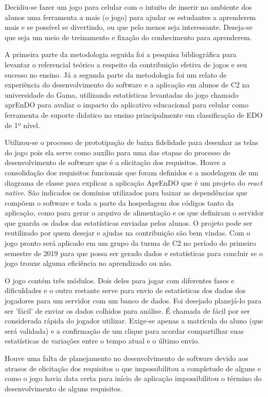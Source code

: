 Decidiu-se fazer um jogo para celular com o intuito de inserir no ambiente dos alunos uma ferramenta a mais (o jogo) para ajudar os estudantes a aprenderem mais e se possível se divertindo, ou que pelo menos seja interessante. Deseja-se que seja um meio de treinamento e fixação do conhecimento para aprenderem.

A primeira parte da metodologia seguida foi a pesquisa bibliográfica para levantar o referencial teórico a respeito da contribuição efetiva de jogos e seu sucesso no ensino. Já a segunda parte da metodologia foi um relato de experiência do desenvolvimento do software e a aplicação em alunos de C2 na universidade do Gama, utilizando estatísticas levantadas do jogo chamado aprEnDO para avaliar o impacto do aplicativo educacional para celular como ferramenta de suporte didatico no ensino principalmente em classificação de EDO de 1º nível.

Utilizou-se o processo de prototipação de baixa fidelidade para desenhar as telas do jogo pois ela serve como auxílio para uma das etapas do processo de desenvolvimento de software que é a elicitação dos requisitos. Houve a consolidação dos requisitos funcionais que foram definidos e a modelagem de um diagrama de classe para explicar a aplicação AprEnDO que é um projeto do \textit{react native}. São indicados os domínios utilizados para baixar as dependências que compõem o software e toda a parte da hospedagem dos códigos tanto da aplicação, como para gerar o arquivo de alimentação e os que definiram o servidor que guarda os dados das estatísticas enviadas pelos alunos. O projeto pode ser reutilizado por quem desejar e ajudas na contribuição são bem vindas. Com o jogo pronto será aplicado em um grupo da turma de C2 no período do primeiro semestre de 2019 para que possa ser gerado dados e estatísticas para concluir se o jogo trouxe alguma eficiência no aprendizado ou não.

O jogo contém três módulos. Dois deles para jogar com diferentes fases e dificuldades e o outro restante serve para envio de estatísticas dos dados dos jogadores para um servidor com um banco de dados. Foi desejado planejá-lo para ser 'fácil' de enviar os dados colhidos para análise. É chamada de fácil por ser considerada rápida do jogador utilizar. Exige-se apenas a matrícula do aluno (que será validada) e a confirmação de um clique para acordar compartilhar suas estatísticas de variações entre o tempo atual e o último envio.

Houve uma falta de planejamento no desenvolvimento de software devido aos atrasos de elicitação dos requisitos o que impossibilitou a completude de alguns e como o jogo havia data certa para início de aplicação impossibilitou o término do desenvolvimento de alguns requisitos. 

